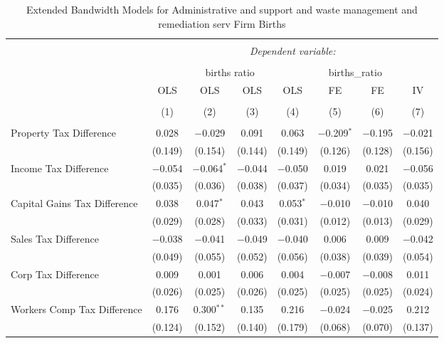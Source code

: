 
\begin{table}[!htbp] \centering 
  \caption{Extended Bandwidth Models for  Administrative and support and waste management and remediation serv Firm Births} 
  \label{} 
\begin{tabular}{@{\extracolsep{5pt}}lccccccc} 
\\[-1.8ex]\hline 
\hline \\[-1.8ex] 
 & \multicolumn{7}{c}{\textit{Dependent variable:}} \\ 
\cline{2-8} 
\\[-1.8ex] & \multicolumn{4}{c}{births ratio} & \multicolumn{2}{c}{births\_ratio} &   \\ 
 & OLS & OLS & OLS & OLS & FE & FE & IV \\ 
\\[-1.8ex] & (1) & (2) & (3) & (4) & (5) & (6) & (7)\\ 
\hline \\[-1.8ex] 
 Property Tax Difference & 0.028 & $-$0.029 & 0.091 & 0.063 & $-$0.209$^{*}$ & $-$0.195 & $-$0.021 \\ 
  & (0.149) & (0.154) & (0.144) & (0.149) & (0.126) & (0.128) & (0.156) \\ 
  Income Tax Difference & $-$0.054 & $-$0.064$^{*}$ & $-$0.044 & $-$0.050 & 0.019 & 0.021 & $-$0.056 \\ 
  & (0.035) & (0.036) & (0.038) & (0.037) & (0.034) & (0.035) & (0.035) \\ 
  Capital Gains Tax Difference & 0.038 & 0.047$^{*}$ & 0.043 & 0.053$^{*}$ & $-$0.010 & $-$0.010 & 0.040 \\ 
  & (0.029) & (0.028) & (0.033) & (0.031) & (0.012) & (0.013) & (0.029) \\ 
  Sales Tax Difference & $-$0.038 & $-$0.041 & $-$0.049 & $-$0.040 & 0.006 & 0.009 & $-$0.042 \\ 
  & (0.049) & (0.055) & (0.052) & (0.056) & (0.038) & (0.039) & (0.054) \\ 
  Corp Tax Difference & 0.009 & 0.001 & 0.006 & 0.004 & $-$0.007 & $-$0.008 & 0.011 \\ 
  & (0.026) & (0.025) & (0.026) & (0.025) & (0.025) & (0.025) & (0.024) \\ 
  Workers Comp Tax Difference & 0.176 & 0.300$^{**}$ & 0.135 & 0.216 & $-$0.024 & $-$0.025 & 0.212 \\ 
  & (0.124) & (0.152) & (0.140) & (0.179) & (0.068) & (0.070) & (0.137) \\ 

\end{tabular}
\end{table}
